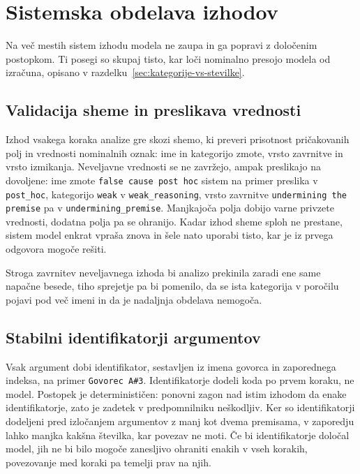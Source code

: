 \documentclass[a4paper, 12pt]{book}
\begin{document}
\section{Sistemska obdelava izhodov}
\label{sec:determinizem}

Na več mestih sistem izhodu modela ne zaupa in ga popravi z določenim
postopkom. Ti posegi so skupaj tisto, kar loči nominalno presojo modela od
izračuna, opisano v razdelku~\ref{sec:kategorije-vs-stevilke}.

\subsection{Validacija sheme in preslikava vrednosti}
\label{ssec:validacija}

Izhod vsakega koraka analize gre skozi shemo, ki preveri prisotnost pričakovanih
polj in vrednosti nominalnih oznak: ime in kategorijo zmote, vrsto zavrnitve in
vrsto izmikanja. Neveljavne vrednosti se ne zavržejo, ampak preslikajo na
dovoljene: ime zmote \texttt{false cause post hoc} sistem na primer preslika v
\texttt{post\_hoc}, kategorijo \texttt{weak} v \texttt{weak\_reasoning}, vrsto
zavrnitve \texttt{undermining the premise} pa v \texttt{undermining\_premise}.
Manjkajoča polja dobijo varne privzete vrednosti, dodatna polja pa se ohranijo.
Kadar izhod sheme sploh ne prestane, sistem model enkrat vpraša znova in šele
nato uporabi tisto, kar je iz prvega odgovora mogoče rešiti.

Stroga zavrnitev neveljavnega izhoda bi analizo prekinila zaradi ene same
napačne besede, tiho sprejetje pa bi pomenilo, da se ista kategorija v poročilu
pojavi pod več imeni in da je nadaljnja obdelava nemogoča.


\subsection{Stabilni identifikatorji argumentov}
\label{ssec:arg-id}

Vsak argument dobi identifikator, sestavljen iz imena govorca in zaporednega
indeksa, na primer \texttt{Govorec~A\#3}. Identifikatorje dodeli koda po prvem
koraku, ne model. Postopek je determinističen: ponovni zagon nad istim izhodom
da enake identifikatorje, zato je zadetek v predpomnilniku neškodljiv. Ker so
identifikatorji dodeljeni pred izločanjem argumentov z manj kot dvema premisama,
v zaporedju lahko manjka kakšna številka, kar povezav ne moti. Če bi
identifikatorje določal model, jih ne bi bilo mogoče zanesljivo ohraniti enakih
v vseh korakih, povezovanje med koraki pa temelji prav na njih.
\end{document}
